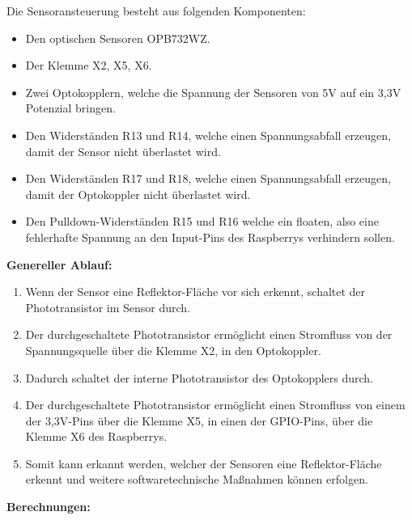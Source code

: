 Die Sensoransteuerung besteht aus folgenden Komponenten:
\begin{itemize}
\item Den optischen Sensoren OPB732WZ.
\item Der Klemme X2, X5, X6. 
\item Zwei Optokopplern, welche die Spannung der Sensoren von 5V auf ein 3,3V Potenzial bringen.
\item Den Widerständen R13 und R14, welche einen Spannungsabfall erzeugen, damit der Sensor nicht überlastet wird.
\item Den Widerständen R17 und R18, welche einen Spannungsabfall erzeugen, damit der Optokoppler nicht überlastet wird.
\item Den Pulldown-Widerständen R15 und R16 welche ein floaten, also eine fehlerhafte Spannung an den Input-Pins des Raspberrys verhindern sollen.\\
\end{itemize}
\newpage
\textbf{Genereller Ablauf:}
\begin{enumerate}
\item Wenn der Sensor eine Reflektor-Fläche vor sich erkennt, schaltet der Phototransistor im Sensor durch.
\item Der durchgeschaltete Phototransistor ermöglicht einen Stromfluss von der Spannungsquelle über die Klemme X2, in den Optokoppler.
\item Dadurch schaltet der interne Phototransistor des Optokopplers durch.
\item Der durchgeschaltete Phototransistor ermöglicht einen Stromfluss von einem der 3,3V-Pins über die Klemme X5, in einen der GPIO-Pins, über die Klemme X6 des Raspberrys.
\item Somit kann erkannt werden, welcher der Sensoren eine Reflektor-Fläche erkennt und weitere softwaretechnische Maßnahmen können erfolgen.
\end{enumerate}
\textbf{Berechnungen:}
